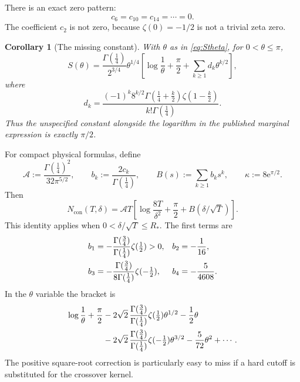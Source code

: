 \documentclass[11pt,a4paper]{article}
\numberwithin{equation}{section}
\newtheorem{corollary}[theorem]{Corollary}
\theoremstyle{definition}
\newcommand{\con}{\mathrm{con}}
\newcommand{\e}{\mathrm e}
\newcommand{\Aconst}{\mathcal A}
\newcommand{\gfour}{\Gamma(\tfrac14)}
\newcommand{\gthree}{\Gamma(\tfrac34)}
\begin{document}
There is an exact zero pattern:
\begin{equation}
 c_6=c_{10}=c_{14}=\cdots=0.
 \label{eq:zeropattern}
\end{equation}
The coefficient $c_2$ is not zero, because $\zeta(0)=-1/2$ is not a
trivial zeta zero.

\begin{corollary}[The missing constant]
\label{cor:missingconstant}
With $\theta$ as in \eqref{eq:Stheta}, for $0<\theta\le\pi$,
\begin{equation}
 S(\theta)=\frac{\gfour}{2^{3/4}}\theta^{1/4}
 \left[\log\frac1\theta+\frac\pi2
       +\sum_{k\ge1}d_k\theta^{k/2}\right],
 \label{eq:published}
\end{equation}
where
\begin{equation}
 d_k=\frac{(-1)^k8^{k/2}\Gamma(\frac14+\frac k2)
                    \zeta(1-\frac k2)}{k!\gfour}.
 \label{eq:dk}
\end{equation}
Thus the unspecified constant alongside the logarithm in the published
marginal expression is exactly $\pi/2$.
\end{corollary}

For compact physical formulas, define
\begin{equation}
 \Aconst:=\frac{\gfour^2}{32\pi^{5/2}},\qquad
 b_k:=\frac{2c_k}{\gfour},\qquad
 B(s):=\sum_{k\ge1}b_k s^k,\qquad
 \kappa:=8\e^{\pi/2}.
 \label{eq:AB}
\end{equation}
Then
\begin{equation}
 \boxed{N_{\con}(T,\delta)=\Aconst T
 \left[\log\frac{8T}{\delta^2}+\frac\pi2
                       +B(\delta/\sqrt T)\right].}
 \label{eq:physicalmain}
\end{equation}
This identity applies when $0<\delta/\sqrt T\le R_*$.
The first terms are
\begin{align}
 b_1&=-\frac{\gthree}{\gfour}\zeta(\tfrac12)>0,
 &b_2&=-\frac1{16},\notag\\
 b_3&=-\frac{\gthree}{8\gfour}\zeta(-\tfrac12),
 &b_4&=-\frac5{4608}.
 \label{eq:firstb}
\end{align}
In the $\theta$ variable the bracket is
\begin{align}
 \log\frac1\theta+\frac\pi2
 &-2\sqrt2\,\frac{\gthree}{\gfour}\zeta(\tfrac12)\theta^{1/2}
 -\frac12\theta\notag\\
 &-2\sqrt2\,\frac{\gthree}{\gfour}\zeta(-\tfrac12)\theta^{3/2}
 -\frac5{72}\theta^2+\cdots.
 \label{eq:firsttheta}
\end{align}
The positive square-root correction is particularly easy to miss if a
hard cutoff is substituted for the crossover kernel.
\end{document}
